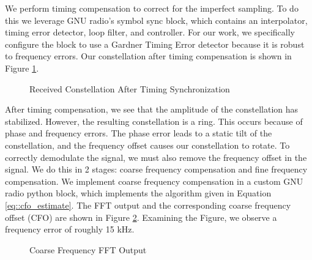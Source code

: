 \documentclass[conference,onecolumn]{IEEEtran}
\begin{document}
\noindent We perform timing compensation to correct for the imperfect sampling. To do this we leverage GNU radio's symbol sync block, which contains an interpolator, timing error detector, loop filter, and controller. For our work, we specifically configure the block to use a Gardner Timing Error detector because it is robust to frequency errors. Our constellation after timing compensation is shown in Figure \ref{fig::constellation_after_timing_comp}.

\begin{figure}[H]
	\centerline{}
	\caption{Received Constellation After Timing Synchronization}
	\label{fig::constellation_after_timing_comp}
\end{figure}

After timing compensation, we see that the amplitude of the constellation has stabilized. However, the resulting constellation is a ring. This occurs because of phase and frequency errors. The phase error leads to a static tilt of the constellation, and the frequency offset causes our constellation to rotate. To correctly demodulate the signal, we must also remove the frequency offset in the signal. We do this in 2 stages: coarse frequency compensation and fine frequency compensation. We implement coarse frequency compensation in a custom GNU radio python block, which implements the algorithm given in Equation \ref{eq::cfo_estimate}. The FFT output and the corresponding coarse frequency offset (CFO) are shown in Figure \ref{fig::cfo_frequency_estimate}. Examining the Figure, we observe a frequency error of roughly 15 kHz.

\begin{figure}[H]
	\centerline{}
	\caption{Coarse Frequency FFT Output}
	\label{fig::cfo_frequency_estimate}
\end{figure}
\end{document}
